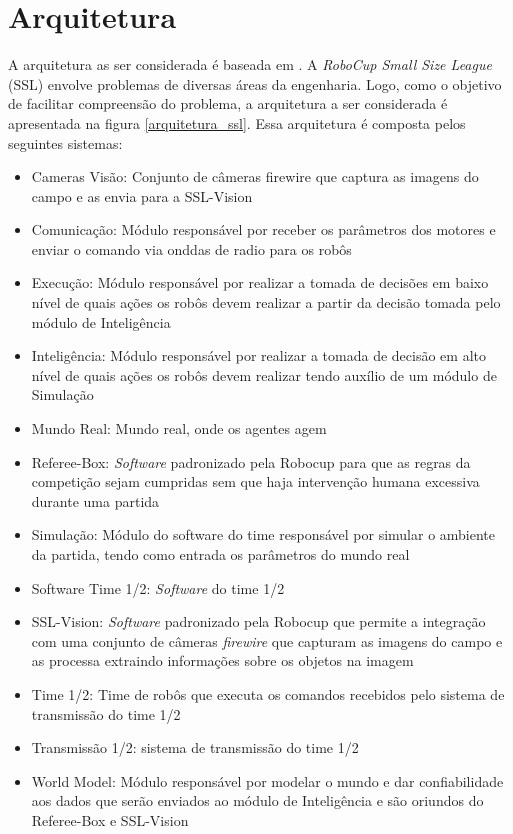 \section{Arquitetura}

A arquitetura as ser considerada é baseada em \cite{felixnavarro}.
A \textit{RoboCup Small Size League} (SSL) envolve problemas de diversas áreas
da engenharia. Logo, como o objetivo de facilitar compreensão do
problema, a arquitetura a ser considerada é apresentada na figura
\ref{arquitetura_ssl}. Essa arquitetura é composta pelos seguintes
sistemas:

\begin{itemize}
  \item Cameras Visão: Conjunto de câmeras firewire que captura as imagens do
        campo e as envia para a SSL-Vision
  \item Comunicação: Módulo responsável por receber os parâmetros
        dos motores e enviar o comando via onddas de radio para os
        robôs
  \item Execução: Módulo responsável por realizar a tomada de decisões
        em baixo nível de quais ações os robôs devem realizar a partir
        da decisão tomada pelo módulo de Inteligência
  \item Inteligência: Módulo responsável por realizar a tomada de
        decisão em alto nível de quais ações os robôs devem realizar 
        tendo auxílio de um módulo de Simulação
  \item Mundo Real: Mundo real, onde os agentes agem
  \item Referee-Box: \textit{Software} padronizado pela Robocup para que as
        regras da competição sejam cumpridas sem que haja intervenção
        humana excessiva durante uma partida
  \item Simulação: Módulo do software do time responsável por simular
        o ambiente da partida, tendo como entrada os parâmetros do mundo
        real
  \item Software Time 1/2: \textit{Software} do time 1/2
  \item SSL-Vision: \textit{Software} padronizado pela Robocup que permite a
        integração com uma conjunto de câmeras \textit{firewire} que capturam as imagens do
        campo e as processa extraindo informações sobre os objetos na
        imagem
  \item Time 1/2: Time de robôs que executa os comandos recebidos pelo
        sistema de transmissão do time 1/2
  \item Transmissão 1/2: sistema de transmissão do time 1/2
  \item World Model: Módulo responsável por modelar o mundo e dar
        confiabilidade aos dados que serão enviados ao módulo de
        Inteligência e são oriundos do Referee-Box e SSL-Vision
\end{itemize}

